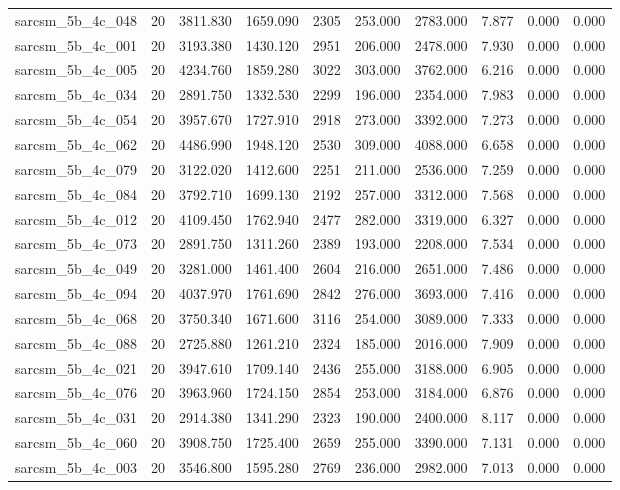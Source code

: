 \begin{tabular}{lrrrrrrrrr}
sarcsm\_5b\_4c\_048 & 20 & 3811.830 & 1659.090 & 2305 & 253.000 & 2783.000 & 7.877 & 0.000 & 0.000 \\
sarcsm\_5b\_4c\_001 & 20 & 3193.380 & 1430.120 & 2951 & 206.000 & 2478.000 & 7.930 & 0.000 & 0.000 \\
sarcsm\_5b\_4c\_005 & 20 & 4234.760 & 1859.280 & 3022 & 303.000 & 3762.000 & 6.216 & 0.000 & 0.000 \\
sarcsm\_5b\_4c\_034 & 20 & 2891.750 & 1332.530 & 2299 & 196.000 & 2354.000 & 7.983 & 0.000 & 0.000 \\
sarcsm\_5b\_4c\_054 & 20 & 3957.670 & 1727.910 & 2918 & 273.000 & 3392.000 & 7.273 & 0.000 & 0.000 \\
sarcsm\_5b\_4c\_062 & 20 & 4486.990 & 1948.120 & 2530 & 309.000 & 4088.000 & 6.658 & 0.000 & 0.000 \\
sarcsm\_5b\_4c\_079 & 20 & 3122.020 & 1412.600 & 2251 & 211.000 & 2536.000 & 7.259 & 0.000 & 0.000 \\
sarcsm\_5b\_4c\_084 & 20 & 3792.710 & 1699.130 & 2192 & 257.000 & 3312.000 & 7.568 & 0.000 & 0.000 \\
sarcsm\_5b\_4c\_012 & 20 & 4109.450 & 1762.940 & 2477 & 282.000 & 3319.000 & 6.327 & 0.000 & 0.000 \\
sarcsm\_5b\_4c\_073 & 20 & 2891.750 & 1311.260 & 2389 & 193.000 & 2208.000 & 7.534 & 0.000 & 0.000 \\
sarcsm\_5b\_4c\_049 & 20 & 3281.000 & 1461.400 & 2604 & 216.000 & 2651.000 & 7.486 & 0.000 & 0.000 \\
sarcsm\_5b\_4c\_094 & 20 & 4037.970 & 1761.690 & 2842 & 276.000 & 3693.000 & 7.416 & 0.000 & 0.000 \\
sarcsm\_5b\_4c\_068 & 20 & 3750.340 & 1671.600 & 3116 & 254.000 & 3089.000 & 7.333 & 0.000 & 0.000 \\
sarcsm\_5b\_4c\_088 & 20 & 2725.880 & 1261.210 & 2324 & 185.000 & 2016.000 & 7.909 & 0.000 & 0.000 \\
sarcsm\_5b\_4c\_021 & 20 & 3947.610 & 1709.140 & 2436 & 255.000 & 3188.000 & 6.905 & 0.000 & 0.000 \\
sarcsm\_5b\_4c\_076 & 20 & 3963.960 & 1724.150 & 2854 & 253.000 & 3184.000 & 6.876 & 0.000 & 0.000 \\
sarcsm\_5b\_4c\_031 & 20 & 2914.380 & 1341.290 & 2323 & 190.000 & 2400.000 & 8.117 & 0.000 & 0.000 \\
sarcsm\_5b\_4c\_060 & 20 & 3908.750 & 1725.400 & 2659 & 255.000 & 3390.000 & 7.131 & 0.000 & 0.000 \\
sarcsm\_5b\_4c\_003 & 20 & 3546.800 & 1595.280 & 2769 & 236.000 & 2982.000 & 7.013 & 0.000 & 0.000 \\

\end{tabular}
